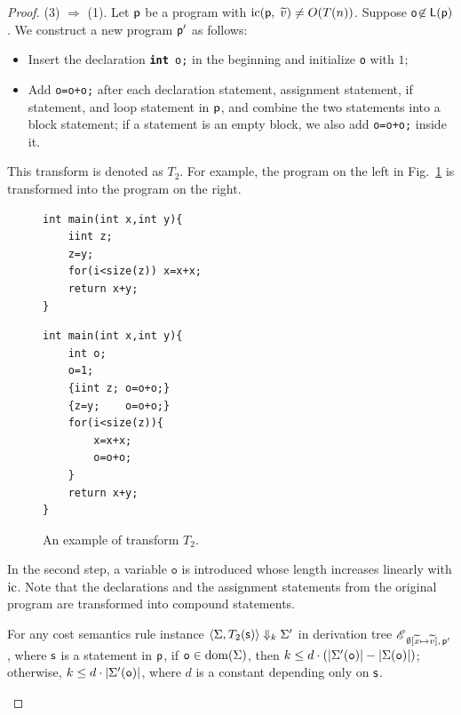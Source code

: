 \documentclass[runningheads]{llncs}
\begin{document}
\begin{proof}
\vspace*{1mm}
\noindent
(3) $\Rightarrow$ (1).\quad
Let $\p$ be a program with $\ic(\p,\;\widetilde{v})\neq O(T(n))$.
Suppose \texttt{o}$\not\in\L(\p)$. We construct a new program $\p'$ as follows:
\begin{itemize}
    \item[a)] Insert the declaration \texttt{\textbf{int} o;} in the beginning and initialize \texttt{o} with $1$;
    \item[b)] Add \texttt{o=o+o;} after each declaration statement, assignment statement, if statement, and loop statement in $\p$, and combine the two statements into a block statement; if a statement is an empty block, we also add \texttt{o=o+o;} inside it.
\end{itemize}
This transform is denoted as $T_2$. For example, the program on the left in Fig.~\ref{fig:T2} is transformed into the program on the right.
\begin{figure}[t]
\begin{minipage}{0.45\linewidth}
\centering
\begin{lstlisting}[xleftmargin=1em,xrightmargin=0.5em]
int main(int x,int y){
    iint z;
    z=y;
    for(i<size(z)) x=x+x;
    return x+y;
}
\end{lstlisting}
\end{minipage}
\hspace{10mm}
\begin{minipage}{0.45\linewidth}
\centering
\begin{lstlisting}[xleftmargin=0.5em,xrightmargin=1em]
int main(int x,int y){
    int o;
    o=1;
    {iint z; o=o+o;}
    {z=y;    o=o+o;}
    for(i<size(z)){
        x=x+x;
        o=o+o;
    }
    return x+y;
}
\end{lstlisting}
\end{minipage}
\caption{An example of transform $T_2$.}
\label{fig:T2}
\end{figure}
In the second step, a variable $\texttt{o}$ is introduced whose length increases linearly with $\ic$. Note that the declarations and the assignment statements from the original program are transformed into compound statements.

\begin{claim}
    For any cost semantics rule instance $\cost{\Sigma}{T_2(\s)}{\Sigma'}{k}$ in derivation tree $\evalTree{\emptyset[\widetilde{x}\mapsto\widetilde{v}]}{\p'}$, where $\s$ is a statement in $\p$,  if $\texttt{o}\in\dom(\Sigma)$, then $k \le d \cdot (\size{\Sigma'(\texttt{o})}-\size{\Sigma(\texttt{o})})$; otherwise, $k \le d \cdot \size{\Sigma'(\texttt{o})}$, where $d$ is a constant depending only on $\s$.
\end{claim}



\end{proof}
\end{document}
